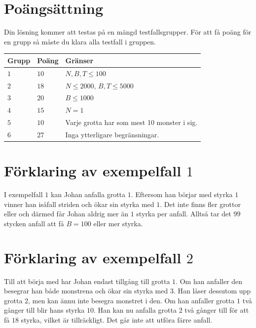 \section*{Poängsättning}
Din lösning kommer att testas på en mängd testfallsgrupper.
För att få poäng för en grupp så måste du klara alla testfall i gruppen.

\noindent
\begin{tabular}{| l | l | p{12cm} |}
  \hline
  \textbf{Grupp} & \textbf{Poäng} & \textbf{Gränser} \\ \hline
  $1$    & $10$       & $N, B, T \leq 100$ \\ \hline
  $2$    & $18$       & $N \leq 2000$, $B, T \leq 5000$ \\ \hline
  $3$    & $20$       & $B \leq 1000$ \\ \hline
  $4$    & $15$       & $N=1$ \\ \hline
  $5$    & $10$       & Varje grotta har som mest 10 monster i sig. \\ \hline
  $6$    & $27$       & Inga ytterligare begränsningar. \\ \hline
\end{tabular}

\section*{Förklaring av exempelfall $1$}
I exempelfall $1$ kan Johan anfalla grotta $1$.
Eftersom han börjar med styrka $1$ vinner han isåfall striden och ökar sin styrka med $1$.
Det inte finns fler grottor eller och därmed får Johan aldrig mer än $1$ styrka per anfall.
Alltså tar det $99$ stycken anfall att få $B=100$ eller mer styrka.

\section*{Förklaring av exempelfall $2$}
Till att börja med har Johan endast tillgång till grotta $1$.
Om han anfaller den besegrar han både monstrena och ökar sin styrka med $3$.
Han låser dessutom upp grotta $2$, men kan ännu inte besegra monstret i den.
Om han anfaller grotta $1$ två gånger till blir hans styrka $10$.
Han kan nu anfalla grotta $2$ två gånger till för att få $18$ styrka, vilket är tillräckligt.
Det går inte att utföra färre anfall.
